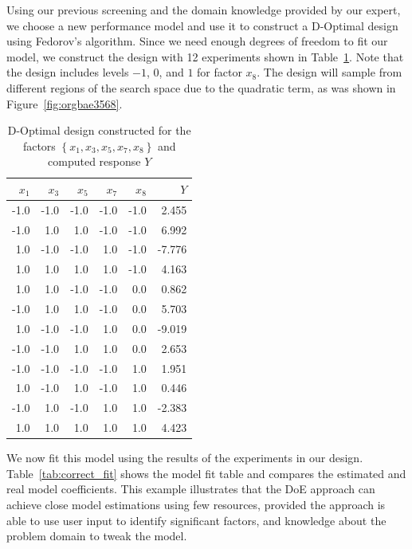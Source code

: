 \documentclass[conference]{IEEEtran}
\begin{document}
Using our previous screening and the domain knowledge provided by our expert, we
choose a new performance model and use  it to construct a D-Optimal design using
Fedorov's algorithm. Since  we need enough degrees of freedom  to fit our model,
we construct the  design with 12 experiments  shown in Table~\ref{tab:d_optimal}.
Note that  the design includes  levels \(-1\), \(0\), and  \(1\) for factor  \(x_8\). The
design  will sample  from  different regions  of  the search  space  due to  the
quadratic term, as was shown in Figure~\ref{fig:orgbae3568}.

\begin{table}[t]
\centering
\caption{D-Optimal design constructed for the factors $\left\{x_1,x_3,x_5,x_7,x_8\right\}$ and computed response $Y$}
\label{tab:d_optimal}
\begingroup\footnotesize
\begin{tabular}{rrrrrr}
  \toprule
$x_1$ & $x_3$ & $x_5$ & $x_7$ & $x_8$ & $Y$ \\
  \midrule
-1.0 & -1.0 & -1.0 & -1.0 & -1.0 & 2.455 \\
  -1.0 & 1.0 & 1.0 & -1.0 & -1.0 & 6.992 \\
  1.0 & -1.0 & -1.0 & 1.0 & -1.0 & -7.776 \\
  1.0 & 1.0 & 1.0 & 1.0 & -1.0 & 4.163 \\
  1.0 & 1.0 & -1.0 & -1.0 & 0.0 & 0.862 \\
  -1.0 & 1.0 & 1.0 & -1.0 & 0.0 & 5.703 \\
  1.0 & -1.0 & -1.0 & 1.0 & 0.0 & -9.019 \\
  -1.0 & -1.0 & 1.0 & 1.0 & 0.0 & 2.653 \\
  -1.0 & -1.0 & -1.0 & -1.0 & 1.0 & 1.951 \\
  1.0 & -1.0 & 1.0 & -1.0 & 1.0 & 0.446 \\
  -1.0 & 1.0 & -1.0 & 1.0 & 1.0 & -2.383 \\
  1.0 & 1.0 & 1.0 & 1.0 & 1.0 & 4.423 \\
   \bottomrule
\end{tabular}
\endgroup
\end{table}

We  now fit  this model  using the  results of  the experiments  in our  design.
Table~\ref{tab:correct_fit} shows the model fit  table and compares the estimated
and real model coefficients. This example  illustrates that the DoE approach can
achieve close  model estimations using  few resources, provided the  approach is
able to use user input to  identify significant factors, and knowledge about the
problem domain to tweak the model.
\end{document}
